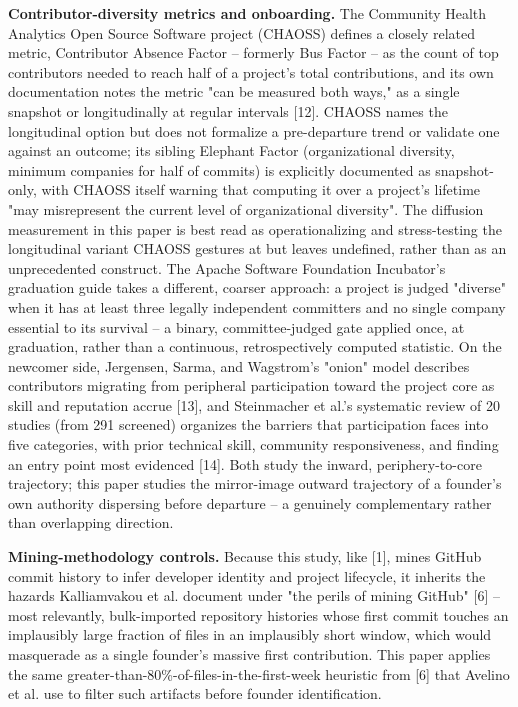 \documentclass[11pt,letterpaper]{article}
\begin{document}
\textbf{Contributor-diversity metrics and onboarding.} The Community Health Analytics Open Source Software project (CHAOSS) defines a closely related metric, Contributor Absence Factor -- formerly Bus Factor -- as the count of top contributors needed to reach half of a project's total contributions, and its own documentation notes the metric "can be measured both ways," as a single snapshot or longitudinally at regular intervals [12]. CHAOSS names the longitudinal option but does not formalize a pre-departure trend or validate one against an outcome; its sibling Elephant Factor (organizational diversity, minimum companies for half of commits) is explicitly documented as snapshot-only, with CHAOSS itself warning that computing it over a project's lifetime "may misrepresent the current level of organizational diversity". The diffusion measurement in this paper is best read as operationalizing and stress-testing the longitudinal variant CHAOSS gestures at but leaves undefined, rather than as an unprecedented construct. The Apache Software Foundation Incubator's graduation guide takes a different, coarser approach: a project is judged "diverse" when it has at least three legally independent committers and no single company essential to its survival -- a binary, committee-judged gate applied once, at graduation, rather than a continuous, retrospectively computed statistic. On the newcomer side, Jergensen, Sarma, and Wagstrom's "onion" model describes contributors migrating from peripheral participation toward the project core as skill and reputation accrue [13], and Steinmacher et al.'s systematic review of 20 studies (from 291 screened) organizes the barriers that participation faces into five categories, with prior technical skill, community responsiveness, and finding an entry point most evidenced [14]. Both study the inward, periphery-to-core trajectory; this paper studies the mirror-image outward trajectory of a founder's own authority dispersing before departure -- a genuinely complementary rather than overlapping direction.

\textbf{Mining-methodology controls.} Because this study, like [1], mines GitHub commit history to infer developer identity and project lifecycle, it inherits the hazards Kalliamvakou et al. document under "the perils of mining GitHub" [6] -- most relevantly, bulk-imported repository histories whose first commit touches an implausibly large fraction of files in an implausibly short window, which would masquerade as a single founder's massive first contribution. This paper applies the same greater-than-80\%-of-files-in-the-first-week heuristic from [6] that Avelino et al. use to filter such artifacts before founder identification.
\end{document}
